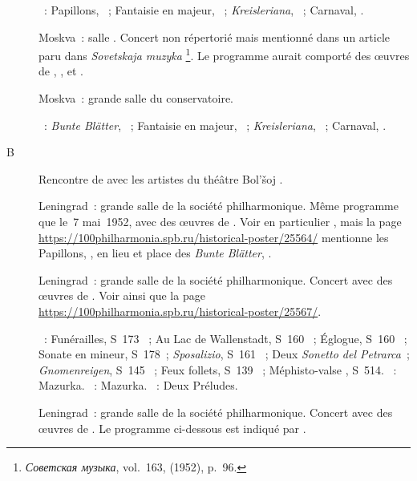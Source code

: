 \begin{description}
 \textsc{\Schumann{}}~: Papillons, ~; Fantaisie en \kC majeur,
 ~; \emph{Kreisleriana}, ~; Carnaval, .
 \item[\DateWithWeekDay{1952-04-16}]
 Moskva~: salle \Tchaikovski{}.
 Concert non répertorié mais mentionné dans un article paru dans
 \emph{Sovetskaja muzyka}%
 \footnote{\foreignlanguage{russian}{\emph{Советская музыка}}, vol.~163,
  (1952), p.~96.}.
 Le programme aurait comporté des œuvres de \Schumann{}, \Chopin{}, \Liszt{}
 et \Debussy{}.
 \item[\DateWithWeekDay{1952-05-07}]
 Moskva~: grande salle du conservatoire.

 \textsc{\Schumann{}}~: \emph{Bunte Blätter}, ~; Fantaisie en \kC
 majeur, ~; \emph{Kreisleriana}, ~; Carnaval, .
 \item[B\DateWithWeekDay{1952-05-10}]
 Rencontre de \VSofronitsky{} avec les artistes du théâtre Bol'šoj
 \citep[voir][p.~173]{Nekrasova08}.
 \item[\DateWithWeekDay{1952-05-14}]
 Leningrad~: grande salle de la société philharmonique.
 Même programme que le~7 mai~1952, avec des œuvres de \Schumann{}.
 Voir en particulier \citet[p.~444]{Milshteyn82a}, mais la page
 \href{https://100philharmonia.spb.ru/historical-poster/25564/}%
 {https://100philharmonia.spb.ru/historical-poster/25564/} mentionne les
 Papillons, , en lieu et place des \emph{Bunte Blätter}, .
 \item[\DateWithWeekDay{1952-05-16}]
 Leningrad~: grande salle de la société philharmonique.
 Concert avec des œuvres de \Liszt{}.
 Voir \citet[p.~223]{Zhukova08} ainsi que la page
 \href{https://100philharmonia.spb.ru/historical-poster/25567/}%
 {https://100philharmonia.spb.ru/historical-poster/25567/}.

 \textsc{\Liszt{}}~: Funérailles, S~173 ~; Au Lac de Wallenstadt,
 S~160 ~; Églogue, S~160 ~; Sonate en \kB mineur,
 S~178~; \emph{Sposalizio}, S~161 ~; Deux \emph{Sonetto del
 Petrarca}~; \emph{Gnomenreigen}, S~145 ~; Feux follets, S~139
 ~; Méphisto-valse , S~514.
 \textsc{\Chopin{}}~: Mazurka.
 \textsc{\Scriabine{}}~: Mazurka.
 \textsc{\Debussy{}}~: Deux Préludes.
 \item[\DateWithWeekDay{1952-05-18}]
 Leningrad~: grande salle de la société philharmonique.
 Concert avec des œuvres de \Liszt{}.
 Le programme ci-dessous est indiqué par \citet[p.~66]{Gakkel86}.


\end{description}
